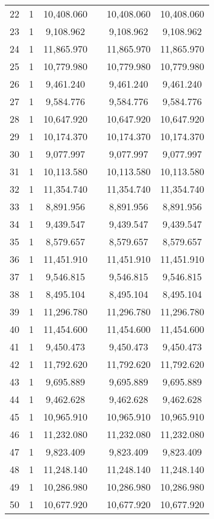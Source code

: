 \begin{table}[!htbp]
\begin{tabular}{@{\extracolsep{5pt}}lccccc}
22 & 1 & 10,408.060 &  & 10,408.060 & 10,408.060 \\ 
23 & 1 & 9,108.962 &  & 9,108.962 & 9,108.962 \\ 
24 & 1 & 11,865.970 &  & 11,865.970 & 11,865.970 \\ 
25 & 1 & 10,779.980 &  & 10,779.980 & 10,779.980 \\ 
26 & 1 & 9,461.240 &  & 9,461.240 & 9,461.240 \\ 
27 & 1 & 9,584.776 &  & 9,584.776 & 9,584.776 \\ 
28 & 1 & 10,647.920 &  & 10,647.920 & 10,647.920 \\ 
29 & 1 & 10,174.370 &  & 10,174.370 & 10,174.370 \\ 
30 & 1 & 9,077.997 &  & 9,077.997 & 9,077.997 \\ 
31 & 1 & 10,113.580 &  & 10,113.580 & 10,113.580 \\ 
32 & 1 & 11,354.740 &  & 11,354.740 & 11,354.740 \\ 
33 & 1 & 8,891.956 &  & 8,891.956 & 8,891.956 \\ 
34 & 1 & 9,439.547 &  & 9,439.547 & 9,439.547 \\ 
35 & 1 & 8,579.657 &  & 8,579.657 & 8,579.657 \\ 
36 & 1 & 11,451.910 &  & 11,451.910 & 11,451.910 \\ 
37 & 1 & 9,546.815 &  & 9,546.815 & 9,546.815 \\ 
38 & 1 & 8,495.104 &  & 8,495.104 & 8,495.104 \\ 
39 & 1 & 11,296.780 &  & 11,296.780 & 11,296.780 \\ 
40 & 1 & 11,454.600 &  & 11,454.600 & 11,454.600 \\ 
41 & 1 & 9,450.473 &  & 9,450.473 & 9,450.473 \\ 
42 & 1 & 11,792.620 &  & 11,792.620 & 11,792.620 \\ 
43 & 1 & 9,695.889 &  & 9,695.889 & 9,695.889 \\ 
44 & 1 & 9,462.628 &  & 9,462.628 & 9,462.628 \\ 
45 & 1 & 10,965.910 &  & 10,965.910 & 10,965.910 \\ 
46 & 1 & 11,232.080 &  & 11,232.080 & 11,232.080 \\ 
47 & 1 & 9,823.409 &  & 9,823.409 & 9,823.409 \\ 
48 & 1 & 11,248.140 &  & 11,248.140 & 11,248.140 \\ 
49 & 1 & 10,286.980 &  & 10,286.980 & 10,286.980 \\ 
50 & 1 & 10,677.920 &  & 10,677.920 & 10,677.920 \\ 

\end{tabular}
\end{table}
